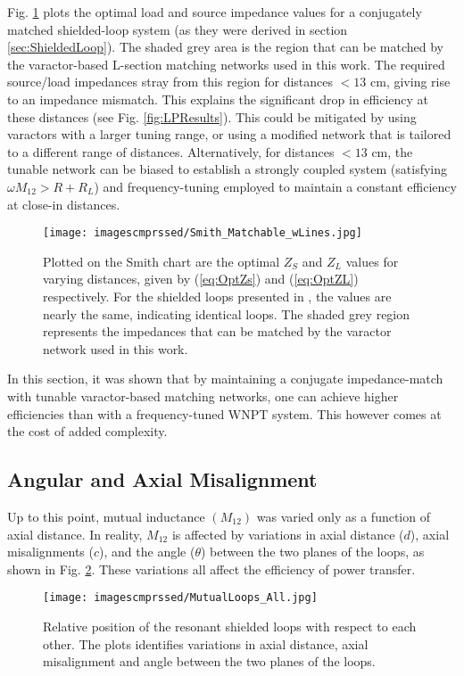 \documentclass[journal]{IEEEtran}
\begin{document}
Fig. \ref{fig:smith} plots the optimal load and source impedance values for a conjugately matched shielded-loop system (as they were derived in section \ref{sec:ShieldedLoop}). The shaded grey area is the region that can be matched by the varactor-based L-section matching networks used in this work. The required source/load impedances stray from this region for distances $<13$ cm, giving rise to an impedance mismatch. This explains the significant drop in efficiency at these distances (see Fig. \ref{fig:LPResults}). This could be mitigated by using varactors with a larger tuning range, or using a modified network that is tailored to a different range of distances. Alternatively, for distances $<13$ cm, the tunable network can be biased to establish a strongly coupled system (satisfying $\omega M_{12} > R+R_L$) and frequency-tuning employed to maintain a constant efficiency at close-in distances.
\begin{figure}[htbp]
    \centering
    \texttt{[image: imagescmprssed/Smith\_Matchable\_wLines.jpg]}
    \caption{Plotted on the Smith chart are the optimal $Z_S$ and $Z_L$ values for varying distances, given by (\ref{eq:OptZs}) and (\ref{eq:OptZL}) respectively. For the shielded loops presented in \cite{Thomas}, the values are nearly the same, indicating identical loops. The shaded grey region represents the impedances that can be matched by the varactor network used in this work.}
    \label{fig:smith}
\end{figure}

In this section, it was shown that by maintaining a conjugate impedance-match with tunable varactor-based matching networks, one can achieve higher efficiencies than with a frequency-tuned WNPT system. This however comes at the cost of added complexity.

\subsection{Angular and Axial Misalignment}

Up to this point, mutual inductance $(M_{12})$ was varied only as a function of axial distance. In reality, $M_{12}$ is affected by variations in axial distance ($d$), axial misalignments ($c$), and the angle ($\theta$) between the two planes of the loops, as shown in Fig. \ref{fig:MutualLoops_All}. These variations all affect the efficiency of power transfer.
\begin{figure}[htbp]
    \centering
    \texttt{[image: imagescmprssed/MutualLoops\_All.jpg]}
    \caption{Relative position of the resonant shielded loops with respect to each other. The plots identifies variations in axial distance, axial misalignment and angle between the two planes of the loops.}
    \label{fig:MutualLoops_All}
\end{figure}
\end{document}
